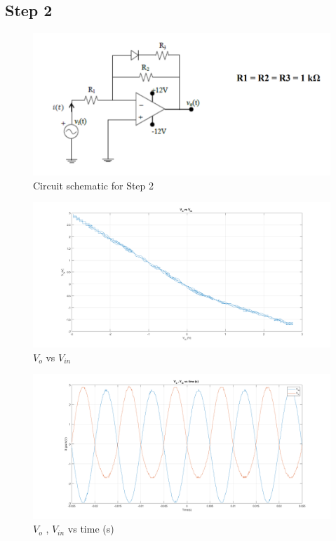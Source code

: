 \documentclass[letterpaper,12pt]{article}
\begin{document}
\subsection{Step 2}
\begin{figure}[H]
	\centering
   \includegraphics[width=1\textwidth]{circuit_2.png}
   \caption{Circuit schematic for Step 2}
\end{figure}

\begin{figure}[H]
	\centering
   \includegraphics[width=1\textwidth]{2_1.png}
   \caption{\(V_{o}\) vs \(V_{in}\)}
\end{figure}

\begin{figure}[H]
	\centering
   \includegraphics[width=1\textwidth]{2_2.png}
   \caption{\(V_{o}\) , \(V_{in}\) vs time (s) }
\end{figure}
\end{document}
